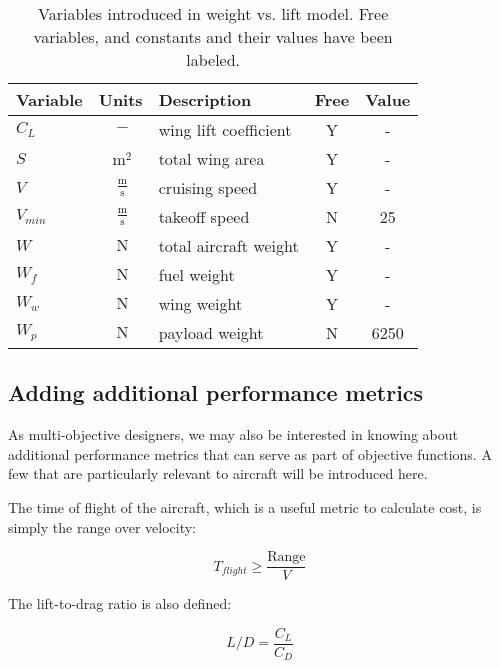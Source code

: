 \begin{footnotesize}
\begin{table}
    \centering
    \begin{tabular}{ l c l c c}
        \toprule
        Variable & Units & Description & Free & Value \\
        \midrule
        $C_L$ & $~\mathrm{-}$ & wing lift coefficient & Y & - \\
        $S$ & $~\mathrm{m^{2}}$ & total wing area & Y & - \\
        $V$ & $~\mathrm{\tfrac{m}{s}}$ & cruising speed & Y & - \\
        $V_{min}$ & $~\mathrm{\tfrac{m}{s}}$ & takeoff speed & N & 25 \\
        $W$ & $~\mathrm{N}$ & total aircraft weight & Y & -\\
        $W_f$ & $~\mathrm{N}$ & fuel weight & Y & -\\
        $W_w$ & $~\mathrm{N}$ & wing weight & Y & - \\
        $W_p$ & $~\mathrm{N}$ & payload weight & N & 6250\\
        \bottomrule
    \end{tabular}
    \label{tab:vars_WandL}
    \caption{Variables introduced in weight vs. lift model. Free variables,
    and constants and their values have been labeled.}
\end{table} \end{footnotesize}

\subsection{Adding additional performance metrics}

As multi-objective designers, we may also be interested in knowing about
additional performance metrics that can serve as part of objective functions. A
few that are particularly relevant to aircraft will be introduced here.

The time of flight of the aircraft, which is a useful metric to calculate cost, is simply the range over velocity:

\begin{equation}
    T_{flight} \geq \frac{\mathrm{Range}}{V}
\end{equation}

The lift-to-drag ratio is also defined: 

\begin{equation}
    L/D = \frac{C_L}{C_D}    
\end{equation}

